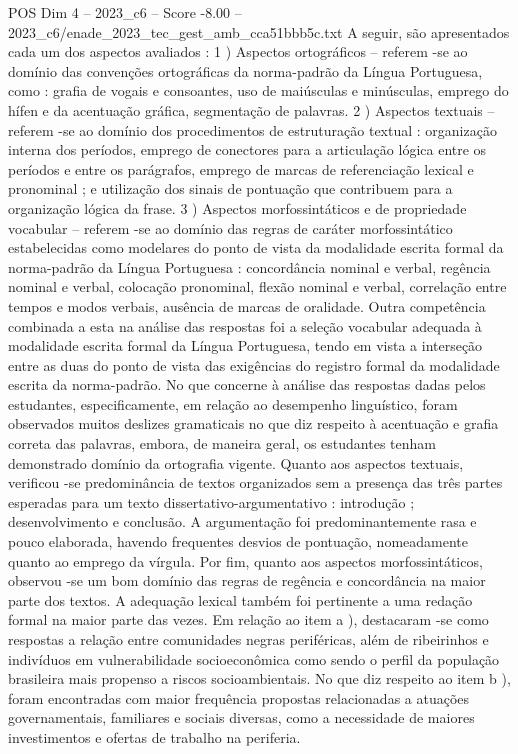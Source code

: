 \begin{textsample}{POS Dim 4 – 2023\_c6 – Score -8.00 – 2023\_c6/enade\_2023\_tec\_gest\_amb\_cca51bbb5c.txt}
A seguir, são apresentados cada um dos aspectos avaliados : 1 ) Aspectos ortográficos – referem -se ao domínio das convenções ortográficas da norma-padrão da Língua Portuguesa, como : grafia de vogais e consoantes, uso de maiúsculas e minúsculas, emprego do hífen e da acentuação gráfica, segmentação de palavras. 2 ) Aspectos textuais – referem -se ao domínio dos procedimentos de estruturação textual : organização interna dos períodos, emprego de conectores para a articulação lógica entre os períodos e entre os parágrafos, emprego de marcas de referenciação lexical e pronominal ; e utilização dos sinais de pontuação que contribuem para a organização lógica da frase. 3 ) Aspectos morfossintáticos e de propriedade vocabular – referem -se ao domínio das regras de caráter morfossintático estabelecidas como modelares do ponto de vista da modalidade escrita formal da norma-padrão da Língua Portuguesa : concordância nominal e verbal, regência nominal e verbal, colocação pronominal, flexão nominal e verbal, correlação entre tempos e modos verbais, ausência de marcas de oralidade.
Outra competência combinada a esta na análise das respostas foi a seleção vocabular adequada à modalidade escrita formal da Língua Portuguesa, tendo em vista a interseção entre as duas do ponto de vista das exigências do registro formal da modalidade escrita da norma-padrão.
No que concerne à análise das respostas dadas pelos estudantes, especificamente, em relação ao desempenho linguístico, foram observados muitos deslizes gramaticais no que diz respeito à acentuação e grafia correta das palavras, embora, de maneira geral, os estudantes tenham demonstrado domínio da ortografia vigente.
Quanto aos aspectos textuais, verificou -se predominância de textos organizados sem a presença das três partes esperadas para um texto dissertativo-argumentativo : introdução ; desenvolvimento e conclusão.
A argumentação foi predominantemente rasa e pouco elaborada, havendo frequentes desvios de pontuação, nomeadamente quanto ao emprego da vírgula.
Por fim, quanto aos aspectos morfossintáticos, observou -se um bom domínio das regras de regência e concordância na maior parte dos textos.
A adequação lexical também foi pertinente a uma redação formal na maior parte das vezes.
Em relação ao item a ), destacaram -se como respostas a relação entre comunidades negras periféricas, além de ribeirinhos e indivíduos em vulnerabilidade socioeconômica como sendo o perfil da população brasileira mais propenso a riscos socioambientais.
No que diz respeito ao item b ), foram encontradas com maior frequência propostas relacionadas a atuações governamentais, familiares e sociais diversas, como a necessidade de maiores investimentos e ofertas de trabalho na periferia.

\end{textsample}
